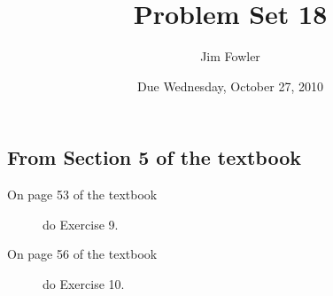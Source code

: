 \documentclass[12pt]{handout}
\author{Jim Fowler}
\title{Problem Set 18}
\date{Due Wednesday, October 27, 2010}
\begin{document}
\maketitle










\subsection*{From Section 5 of the textbook}



\begin{description}

\item[On page 53 of the textbook] do Exercise 9.

\item[On page 56 of the textbook] do Exercise 10.

\end{description}
\end{document}
